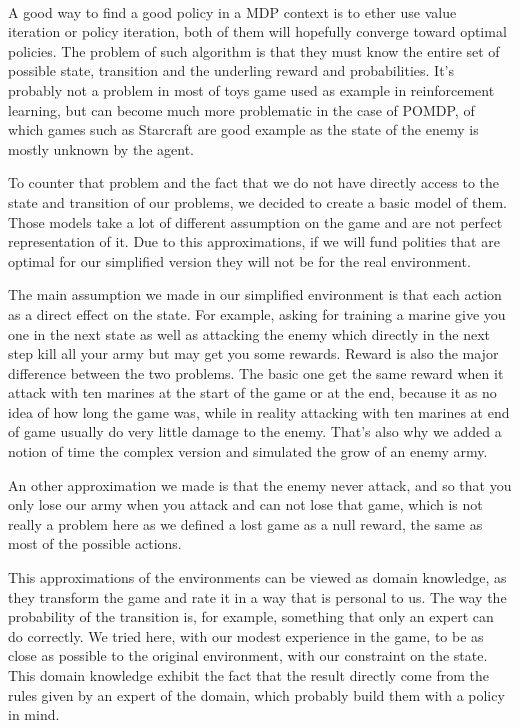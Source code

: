 \documentclass[twocolumn,a4paper,10pt]{article}
\begin{document}
\paragraph{}

A good way to find a good policy in a MDP context is to
ether use value iteration or policy iteration, both of them will hopefully
converge toward optimal policies. The problem of such algorithm is
that they must know the entire set of possible state, transition and
the underling reward and probabilities. It's probably not a problem
in most of toys game used as example in reinforcement learning, but
can become much more problematic in the case of POMDP, of which games
such as Starcraft are good example as the state of the enemy is mostly
unknown by the agent.

To counter that problem and the fact that we do not have directly
access to the state and transition of our problems, we decided to
create a basic model of them. Those models take a lot of different
assumption on the game and are not perfect representation of it. Due
to this approximations, if we will fund polities that are optimal
for our simplified version they will not be for the real environment.

The main assumption we made in our simplified environment is that
each action as a direct effect on the state. For example, asking for
training a marine give you one in the next state as well as attacking
the enemy which directly in the next step kill all your army but may
get you some rewards. Reward is also the major difference between
the two problems. The basic one get the same reward when it attack
with ten marines at the start of the game or at the end, because it
as no idea of how long the game was, while in reality attacking with
ten marines at end of game usually do very little damage to the enemy.
That's also why we added a notion of time the complex version and
simulated the grow of an enemy army.

An other approximation we made is that the enemy never attack, and
so that you only lose our army when you attack and can not lose that
game, which is not really a problem here as we defined a lost game
as a null reward, the same as most of the possible actions.

This approximations of the environments can be viewed as domain knowledge,
as they transform the game and rate it in a way that is personal to
us. The way the probability of the transition is, for example, something
that only an expert can do correctly. We tried here, with our modest
experience in the game, to be as close as possible to the original
environment, with our constraint on the state. This domain knowledge
exhibit the fact that the result directly come from the rules given
by an expert of the domain, which probably build them with a policy in
mind.
\end{document}
